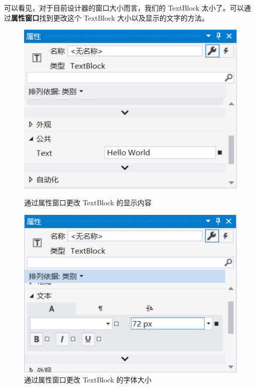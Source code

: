可以看见，对于目前设计器的窗口大小而言，我们的 TextBlock 太小了。可以通过\textbf{属性窗口}找到更改这个 TextBlock 大小以及显示的文字的方法。
\begin{figure}[htbp]
    \centering
    \begin{minipage}[t]{0.4\paperwidth}
        \centering
        \includegraphics[width = 0.3\paperwidth]{pic/12.png}
        \caption{通过属性窗口更改 TextBlock 的显示内容}
    \end{minipage}
    \begin{minipage}[t]{0.4\paperwidth}
        \centering
        \includegraphics[width = 0.3\paperwidth]{pic/13.png}
        \caption{通过属性窗口更改 TextBlock 的字体大小}
    \end{minipage}
\end{figure}

